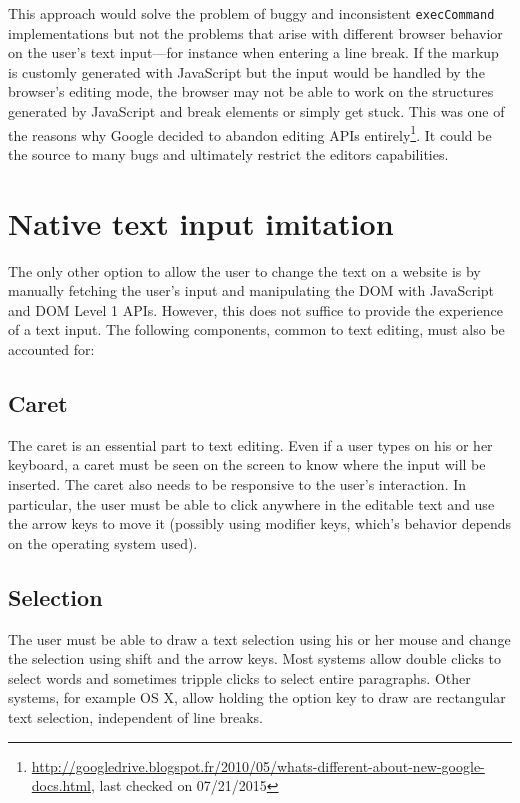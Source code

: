 This approach would solve the problem of buggy and inconsistent \texttt{execCommand} implementations but not the problems that arise with different browser behavior on the user's text input---for instance when entering a line break. If the markup is customly generated with JavaScript but the input would be handled by the browser's editing mode, the browser may not be able to work on the structures generated by JavaScript and break elements or simply get stuck. This was one of the reasons why Google decided to abandon editing APIs entirely\footnote{\url{http://googledrive.blogspot.fr/2010/05/whats-different-about-new-google-docs.html}, last checked on 07/21/2015}. It could be the source to many bugs and ultimately restrict the editors capabilities.

\section{Native text input imitation} 
\label{subsec:concept_native_imitation}

The only other option to allow the user to change the text on a website is by manually fetching the user's input and manipulating the DOM with JavaScript and DOM Level 1 APIs. However, this does not suffice to provide the experience of a text input. The following components, common to text editing, must also be accounted for:



\subsection{Caret} 

The caret is an essential part to text editing. Even if a user types on his or her keyboard, a caret must be seen on the screen to know where the input will be inserted. The caret also needs to be responsive to the user's interaction. In particular, the user must be able to click anywhere in the editable text and use the arrow keys to move it (possibly using modifier keys, which's behavior depends on the operating system used).

\subsection{Selection} 
The user must be able to draw a text selection using his or her mouse and change the selection using shift and the arrow keys. Most systems allow double clicks to select words and sometimes tripple clicks to select entire paragraphs. Other systems, for example OS X, allow holding the option key to draw are rectangular text selection, independent of line breaks.

